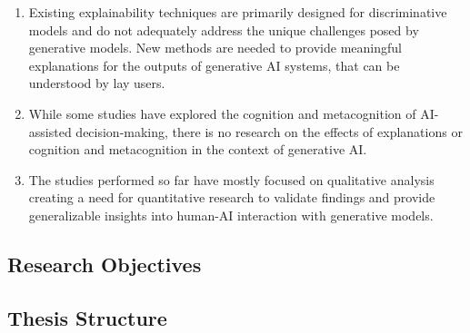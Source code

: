 \begin{enumerate}
    \item Existing explainability techniques are primarily designed for discriminative models and do not adequately address the unique challenges posed by generative models. New methods are needed to provide meaningful explanations for the outputs of generative \ac{AI} systems, that can be understood by lay users.
    \item While some studies have explored the cognition and metacognition of \ac{AI}-assisted decision-making, there is no research on the effects of explanations or cognition and metacognition in the context of generative \ac{AI}.
    \item The studies performed so far have mostly focused on qualitative analysis creating a need for quantitative research to validate findings and provide generalizable insights into human-\ac{AI} interaction with generative models.
\end{enumerate}

\subsection{Research Objectives} \label{subsec:research-objectives}


\subsection{Thesis Structure} \label{subsec:thesis-structure}
